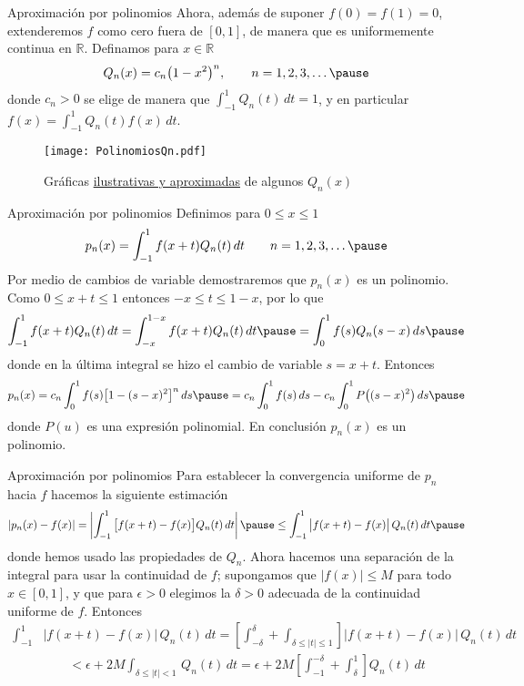 \documentclass[xcolor=dvipsnames,10pt,handout, draft]{beamer}
\newcommand{\rz}{\mathbb R}
\begin{document}
\begin{frame}{Aproximaci\'on por polinomios}
Ahora, adem\'as de suponer  $f(0)=f(1)=0$, extenderemos $f$ como cero fuera de $[0,1]$, de manera que es uniformemente continua en $\rz$.
\pause\vskip5pt
Definamos para $x\in\rz$
$$Q_n(x)=c_n\big(1-x^2\big)^n,\qquad n=1,2,3,\dots\pause$$
donde $c_n>0$ se elige de manera que $\displaystyle\int_{-1}^1Q_n(t)\,dt=1$, \pause y en particular  $\displaystyle f(x)=\int_{-1}^1Q_n(t)f(x)\,dt$.
\vskip-1cm
\begin{figure}[ht]
\texttt{[image: PolinomiosQn.pdf]}
\caption{Gr\'aficas \underline{ilustrativas y aproximadas} de algunos $Q_n(x)$}
\end{figure}
\end{frame}


\begin{frame}{Aproximaci\'on por polinomios}
Definimos para $0\leq x\leq 1$
$$p_n(x)=\int_{-1}^{1}f(x+t)Q_n(t)\,dt\qquad n=1,2,3,\dots\pause$$
Por medio de cambios de variable demostraremos que $p_n(x)$ es un polinomio.
\vskip5pt\pause
Como $0\leq x+t\leq 1$ entonces $-x\leq t\leq 1-x$, por lo que 
$$\int_{-1}^{1}f(x+t)Q_n(t)\,dt=\int_{-x}^{1-x}f(x+t)Q_n(t)\,dt\pause=\int_{0}^{1}f(s)Q_n(s-x)\,ds\pause$$
donde en la \'ultima integral se hizo el cambio de variable $s=x+t$. \pause
Entonces 
$$p_n(x)=c_n\int_{0}^{1}f(s)\big[1-(s-x)^2\big]^n\,ds\pause=c_n\int_{0}^{1}f(s)\,ds-c_n\int_{0}^{1}P\big((s-x)^2\big)\,ds\pause$$
donde $P(u)$ es una expresi\'on polinomial. \pause En conclusi\'on $p_n(x)$ es un polinomio. 
\end{frame}


\begin{frame}{Aproximaci\'on por polinomios}
Para establecer la convergencia uniforme de $p_n$ hacia $f$ hacemos la siguiente estimaci\'on
$$|p_n(x)-f(x)|=\left|\int_{-1}^{1}\big[f(x+t)-f(x)\big]Q_n(t)\,dt\right|\pause\leq\int_{-1}^{1}\big|f(x+t)-f(x)\big|\,Q_n(t)\,dt\pause$$
donde hemos usado las propiedades de $Q_n$.
\vskip5pt\pause
Ahora hacemos una separaci\'on de la integral para usar la continuidad de $f$; \pause supongamos que $|f(x)|\leq M$ para todo $x\in [0,1]$, \pause y que para $\epsilon>0$ elegimos la $\delta>0$ adecuada de la continuidad uniforme de $f$. \pause Entonces
\begin{align*}
\int_{-1}^{1}&\big|f(x+t)-f(x)\big|\,Q_n(t)\,dt=\left[\int_{-\delta}^{\delta}+\int_{\delta\leq|t|\leq1}\right]\big|f(x+t)-f(x)\big|\,Q_n(t)\,dt\\
&\qquad<\epsilon+2M\int_{\delta\leq|t|<1}\,Q_n(t)\,dt=\epsilon+2M\left[\int_{-1}^{-\delta}+\int_{\delta}^{1}\right]Q_n(t)\,dt
\end{align*}
\end{frame}
\end{document}
